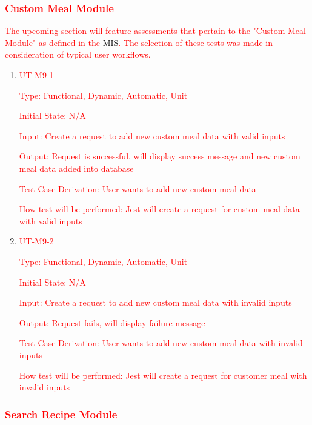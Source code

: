 \documentclass[12pt, titlepage]{article}
\begin{document}
\subsubsection{\textcolor{red}{Custom Meal Module}}

\textcolor{red}{The upcoming section will feature assessments that pertain to the "Custom Meal Module" as defined in the \href{https://github.com/BillNguyen1999/REVITALIZE/blob/main/docs/Design/SoftDetailedDes/MIS.pdf}{\color{blue}MIS}. The selection of these tests was made in consideration of typical user workflows.}

\begin{enumerate}

	\item{\textcolor{red}{UT-M9-1\\}}

	\textcolor{red}{Type: Functional, Dynamic, Automatic, Unit}

	\textcolor{red}{Initial State: N/A}

	\textcolor{red}{Input: Create a request to add new custom meal data with valid inputs}

	\textcolor{red}{Output: Request is successful, will display success message and new custom meal data added into database}

	\textcolor{red}{Test Case Derivation: User wants to add new custom meal data}

	\textcolor{red}{How test will be performed: Jest will create a request for custom meal data with valid inputs}

	\item{\textcolor{red}{UT-M9-2\\}}

	\textcolor{red}{Type: Functional, Dynamic, Automatic, Unit}

	\textcolor{red}{Initial State: N/A}

	\textcolor{red}{Input: Create a request to add new custom meal data with invalid inputs}

	\textcolor{red}{Output: Request fails, will display failure message}

	\textcolor{red}{Test Case Derivation: User wants to add new custom meal data with invalid inputs}

    \textcolor{red}{How test will be performed: Jest will create a request for customer meal with invalid inputs}

\end{enumerate}

\subsubsection{\textcolor{red}{Search Recipe Module}}
\end{document}

